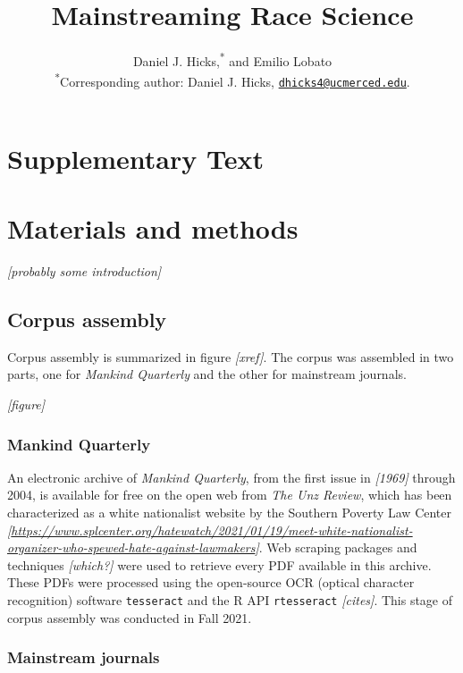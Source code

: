 \documentclass[12pt]{article}
\title{\bf Mainstreaming Race Science}
\author{
Daniel J. Hicks,\textsuperscript{*}
and Emilio Lobato
\\\textsuperscript{*}Corresponding author: Daniel J. Hicks, \href{mailto:dhicks4@ucmerced.edu}{\nolinkurl{dhicks4@ucmerced.edu}}.
}
\date{}
\begin{document}
\maketitle
\section*{Supplementary Text}
\renewcommand{\thesection}{S\arabic{section}}
\hypertarget{materials-and-methods}{%
\section*{Materials and methods}\label{materials-and-methods}}

\emph{{[}probably some introduction{]}}

\hypertarget{corpus-assembly}{%
\subsection*{Corpus assembly}\label{corpus-assembly}}

Corpus assembly is summarized in figure \emph{{[}xref{]}}. The corpus was assembled in two parts, one for \emph{Mankind Quarterly} and the other for mainstream journals.

\emph{{[}figure{]}}

\hypertarget{mankind-quarterly}{%
\subsubsection*{Mankind Quarterly}\label{mankind-quarterly}}

An electronic archive of \emph{Mankind Quarterly}, from the first issue in \emph{{[}1969{]}} through 2004, is available for free on the open web from \emph{The Unz Review}, which has been characterized as a white nationalist website by the Southern Poverty Law Center \emph{{[}\url{https://www.splcenter.org/hatewatch/2021/01/19/meet-white-nationalist-organizer-who-spewed-hate-against-lawmakers}{]}}. Web scraping packages and techniques \emph{{[}which?{]}} were used to retrieve every PDF available in this archive. These PDFs were processed using the open-source OCR (optical character recognition) software \texttt{tesseract} and the R API \texttt{rtesseract} \emph{{[}cites{]}}. This stage of corpus assembly was conducted in Fall 2021.

\hypertarget{mainstream-journals}{%
\subsubsection*{Mainstream journals}\label{mainstream-journals}}
\end{document}
